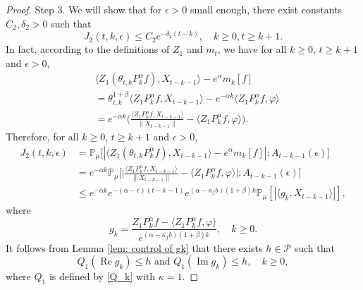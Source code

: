 \documentclass[12pt,a4paper]{amsart}
\theoremstyle{plain}
\theoremstyle{definition}
\numberwithin{equation}{section}
\begin{document}
\begin{proof}
    Step 3.
    We will show that for $\epsilon>0$ small enough, there exist constants $C_2, \delta_2>0$ such that
\begin{equation}
\label{eq:31step3}
    J_2(t,k,\epsilon)
    \leq C_2e^{-\delta_2 (t-k)},
    \quad k\geq 0, t\geq k+1.
\end{equation}
    In fact, according to the definitions of $Z_1$ and $m_t$, we have for all $k\geq 0$, $t\geq k+1$ and $\epsilon> 0$,
\begin{align}
    &\langle Z_1(\theta_{t,k}P^\alpha_k f),X_{t-k-1}\rangle-e^{\alpha}m_k[f]
    \\&= \theta_{t,k}^{1+\beta} \langle Z_1P^\alpha_k f,X_{t-k-1}\rangle - e^{-\alpha k}\langle  Z_1P^\alpha_k f,\varphi\rangle
    \\&=e^{-\alpha k}\Big(\frac{\langle Z_1P^\alpha_k f ,X_{t-k-1}\rangle}{\|X_{t-k-1}\|}-\langle  Z_1P^\alpha_k f ,\varphi\rangle\Big).
\end{align}
    Therefore, for all $k\geq 0$, $t\geq k+1$ and $\epsilon> 0$,
\begin{align}
\label{eq: prevJ2}
    J_2(t,k,\epsilon)&
    = \mathbb P_\mu\big[|\langle Z_1(\theta_{t,k}P^\alpha_k f),X_{t-k-1}\rangle-e^{\alpha}m_k[f]|;A_{t-k-1}(\epsilon)\big]
    \\&=e^{-\alpha k}\mathbb{P}_{\mu}\bigg[\Big|\frac{\langle Z_1P^{\alpha}_k f,X_{t-k-1}\rangle}{\|X_{t-k-1}\|}-\langle  Z_1P^{\alpha}_k f,\varphi\rangle\Big|;A_{t-k-1}(\epsilon)\bigg]\nonumber\\
    &\leq e^{-\alpha k}e^{-(\alpha-\epsilon)(t-k-1)}e^{(\alpha-\kappa_f b)(1+\beta)k} \mathbb{P}_{\mu}\left[\left|\langle g_k,X_{t-k-1}\rangle\right|\right],
\end{align}
where
\[
    g_k
    = \frac{Z_1 P^{\alpha}_k f-\langle  Z_1P^{\alpha}_k f,\varphi\rangle}{e^{(\alpha-\kappa_f b)(1+\beta)k}},
    \quad k \geq 0.
\]
    It follows from Lemma \ref{lem: control of gk} that there exists $h\in \mathcal{P}$ such that
 \[
    Q_1 (\operatorname{Re} g_k) \leq h
    \text{ and } Q_1 (\operatorname{Im} g_k)\leq h,
    \quad k \geq 0,
 \]
    where $Q_1$ is defined by \eqref{Q_k} with $\kappa=1$.


\end{proof}
\end{document}
